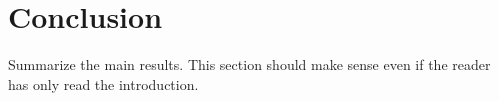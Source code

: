 \chapter{Conclusion}

Summarize the main results. This section should make sense even if the reader has only read the introduction.



